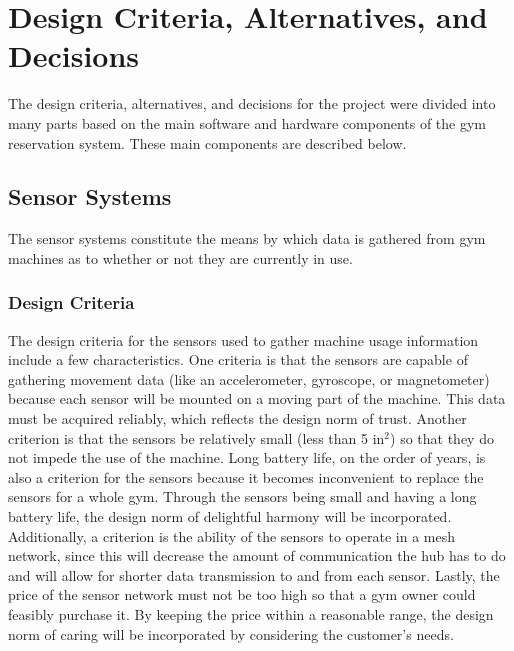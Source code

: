 \documentclass[PPFS.tex]{template/subfiles}
\begin{document}
\section{Design Criteria, Alternatives, and Decisions}

The design criteria, alternatives, and decisions for the project were divided into many parts based on the main software and hardware components of the gym reservation system. These main components are described below.

\subsection{Sensor Systems}

The sensor systems constitute the means by which data is gathered from gym machines as to whether or not they are currently in use.

\subsubsection{Design Criteria}

The design criteria for the sensors used to gather machine usage information include a few characteristics. One criteria is that the sensors are capable of gathering movement data (like an accelerometer, gyroscope, or magnetometer) because each sensor will be mounted on a moving part of the machine. This data must be acquired reliably, which reflects the design norm of trust. Another criterion is that the sensors be relatively small (less than 5 in$^2$) so that they do not impede the use of the machine. Long battery life, on the order of years, is also a criterion for the sensors because it becomes inconvenient to replace the sensors for a whole gym. Through the sensors being small and having a long battery life, the design norm of delightful harmony will be incorporated. Additionally, a criterion is the ability of the sensors to operate in a mesh network, since this will decrease the amount of communication the hub has to do and will allow for shorter data transmission to and from each sensor. Lastly, the price of the sensor network must not be too high so that a gym owner could feasibly purchase it. By keeping the price within a reasonable range, the design norm of caring will be incorporated by considering the customer's needs.
\end{document}
